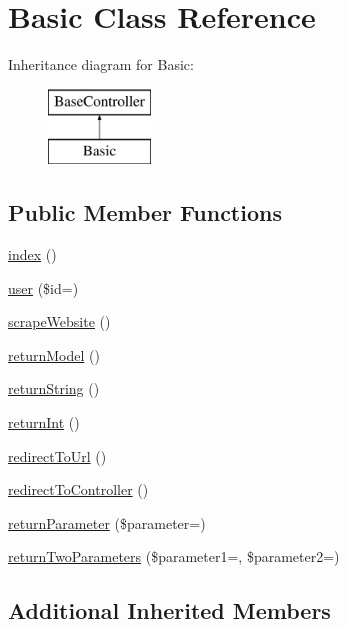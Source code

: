 \hypertarget{class_basic}{}\section{Basic Class Reference}
\label{class_basic}
Inheritance diagram for Basic\+:\begin{figure}[H]
\begin{center}
\leavevmode
\includegraphics[height=2.000000cm]{class_basic}
\end{center}
\end{figure}
\subsection*{Public Member Functions}
\begin{DoxyCompactItemize}
\item 
\hyperlink{class_basic_a149eb92716c1084a935e04a8d95f7347}{index} ()
\item 
\hyperlink{class_basic_a6603546e99f9519b86989be128736ad6}{user} (\$id=\textquotesingle{}\textquotesingle{})
\item 
\hyperlink{class_basic_a48ffe9a27b91ce968b2bcf5e0a9d4069}{scrape\+Website} ()
\item 
\hyperlink{class_basic_a7cb6a02987f0faaef2ee4aff9198907e}{return\+Model} ()
\item 
\hyperlink{class_basic_a5bb666dcea19a9561c2047cfa25936bd}{return\+String} ()
\item 
\hyperlink{class_basic_a8d2918087022004ef5ad62d8f76a73d7}{return\+Int} ()
\item 
\hyperlink{class_basic_abf786273f796a96f5532dc60f9cec813}{redirect\+To\+Url} ()
\item 
\hyperlink{class_basic_a53f01fc4c43d1cecc497d9645f920407}{redirect\+To\+Controller} ()
\item 
\hyperlink{class_basic_ac380e8a432563c6affcfddd43384c1d2}{return\+Parameter} (\$parameter=\textquotesingle{}\textquotesingle{})
\item 
\hyperlink{class_basic_a2ef87b96abcca966a41e34d077fcc38e}{return\+Two\+Parameters} (\$parameter1=\textquotesingle{}\textquotesingle{}, \$parameter2=\textquotesingle{}\textquotesingle{})
\end{DoxyCompactItemize}
\subsection*{Additional Inherited Members}


